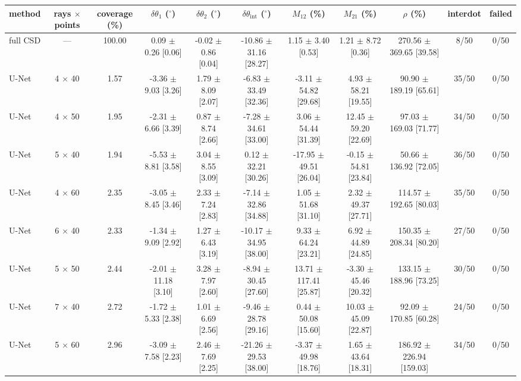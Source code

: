 \begin{tabular}{lcccccccccc}
\hline
method & rays $\times$ points & coverage (\%) & $\delta\theta_1$ ($^\circ$) & $\delta\theta_2$ ($^\circ$) & $\delta\theta_\mathrm{int}$ ($^\circ$) & $M_{12}$ (\%) & $M_{21}$ (\%) & $\rho$ (\%) & interdot & failed \\ \hline
full CSD & — & 100.00 & 0.09 $\pm$ 0.26 [0.06] & -0.02 $\pm$ 0.86 [0.04] & -10.86 $\pm$ 31.16 [28.27] & 1.15 $\pm$ 3.40 [0.53] & 1.21 $\pm$ 8.72 [0.36] & 270.56 $\pm$ 369.65 [39.58] & 8/50 & 0/50 \\
U-Net & 4 $\times$ 40 & 1.57 & -3.36 $\pm$ 9.03 [3.26] & 1.79 $\pm$ 8.09 [2.07] & -6.83 $\pm$ 33.49 [32.36] & -3.11 $\pm$ 54.82 [29.68] & 4.93 $\pm$ 58.21 [19.55] & 90.90 $\pm$ 189.19 [65.61] & 35/50 & 0/50 \\
U-Net & 4 $\times$ 50 & 1.95 & -2.31 $\pm$ 6.66 [3.39] & 0.87 $\pm$ 8.74 [2.66] & -7.28 $\pm$ 34.61 [33.00] & 3.06 $\pm$ 54.44 [31.39] & 12.45 $\pm$ 59.20 [22.69] & 97.03 $\pm$ 169.03 [71.77] & 34/50 & 0/50 \\
U-Net & 5 $\times$ 40 & 1.94 & -5.53 $\pm$ 8.81 [3.58] & 3.04 $\pm$ 8.55 [3.09] & 0.12 $\pm$ 32.21 [30.26] & -17.95 $\pm$ 49.51 [26.04] & -0.15 $\pm$ 54.81 [23.84] & 50.66 $\pm$ 136.92 [72.05] & 36/50 & 0/50 \\
U-Net & 4 $\times$ 60 & 2.35 & -3.05 $\pm$ 8.45 [3.46] & 2.33 $\pm$ 7.24 [2.83] & -7.14 $\pm$ 32.86 [34.88] & 1.05 $\pm$ 51.68 [31.10] & 2.32 $\pm$ 49.37 [27.71] & 114.57 $\pm$ 192.65 [80.03] & 35/50 & 0/50 \\
U-Net & 6 $\times$ 40 & 2.33 & -1.34 $\pm$ 9.09 [2.92] & 1.27 $\pm$ 6.43 [3.19] & -10.17 $\pm$ 34.95 [38.00] & 9.33 $\pm$ 64.24 [23.21] & 6.92 $\pm$ 44.89 [24.85] & 150.35 $\pm$ 208.34 [80.20] & 27/50 & 0/50 \\
U-Net & 5 $\times$ 50 & 2.44 & -2.01 $\pm$ 11.18 [3.10] & 3.28 $\pm$ 7.97 [2.60] & -8.94 $\pm$ 30.45 [27.60] & 13.71 $\pm$ 117.41 [25.87] & -3.30 $\pm$ 45.46 [20.32] & 133.15 $\pm$ 188.96 [73.25] & 30/50 & 0/50 \\
U-Net & 7 $\times$ 40 & 2.72 & -1.72 $\pm$ 5.33 [2.38] & 1.01 $\pm$ 6.69 [2.56] & -9.46 $\pm$ 28.78 [29.16] & 0.44 $\pm$ 50.08 [15.60] & 10.03 $\pm$ 45.09 [22.87] & 92.09 $\pm$ 170.85 [60.28] & 24/50 & 0/50 \\
U-Net & 5 $\times$ 60 & 2.96 & -3.09 $\pm$ 7.58 [2.23] & 2.46 $\pm$ 7.69 [2.25] & -21.26 $\pm$ 29.53 [38.00] & -3.37 $\pm$ 49.98 [18.76] & 1.65 $\pm$ 43.64 [18.31] & 186.92 $\pm$ 226.94 [159.03] & 34/50 & 0/50 \\

\end{tabular}
